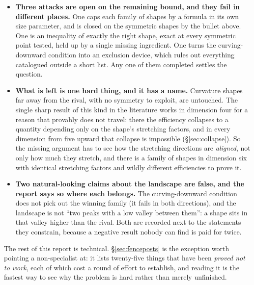 \begin{itemize}[leftmargin=1.4em]
\item \textbf{Three attacks are open on the remaining bound, and they fail in different places.} One caps each family of shapes by a formula in its own size parameter, and is closed on the symmetric shapes by the bullet above. One is an inequality of exactly the right shape, exact at every symmetric point tested, held up by a single missing ingredient. One turns the curving-downward condition into an exclusion device, which rules out everything catalogued outside a short list. Any one of them completed settles the question.
\item \textbf{What is left is one hard thing, and it has a name.} Curvature shapes far away from the rival, with no symmetry to exploit, are untouched. The single sharp result of this kind in the literature works in dimension four for a reason that provably does not travel: there the efficiency collapses to a quantity depending only on the shape's stretching factors, and in every dimension from five upward that collapse is impossible (\S\ref{sec:collapse}). So the missing argument has to see how the stretching directions are \emph{aligned}, not only how much they stretch, and there is a family of shapes in dimension six with identical stretching factors and wildly different efficiencies to prove it.
\item \textbf{Two natural-looking claims about the landscape are false, and the report says so where each belongs.} The curving-downward condition does not pick out the winning family (it fails in both directions), and the landscape is not ``two peaks with a low valley between them'': a shape sits in that valley higher than the rival. Both are recorded next to the statements they constrain, because a negative result nobody can find is paid for twice.
\end{itemize}

The rest of this report is technical. \S\ref{sec:fenceposts} is the exception worth pointing a non-specialist at: it lists twenty-five things that have been \emph{proved not to work}, each of which cost a round of effort to establish, and reading it is the fastest way to see why the problem is hard rather than merely unfinished.

